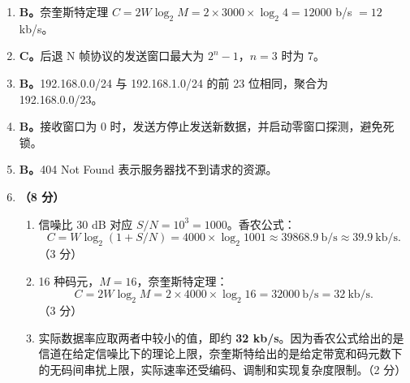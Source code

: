 \documentclass[a4paper,11pt]{article}
\begin{document}

\begin{enumerate}[start=13, label=\textbf{\arabic*.}, leftmargin=2.4em, itemsep=0.45em]

\item \textbf{B。}奈奎斯特定理 $C=2W\log_2M=2\times3000\times\log_2 4=12000$ b/s $=12$ kb/s。

\item \textbf{C。}后退 N 帧协议的发送窗口最大为 $2^{n}-1$，$n=3$ 时为 7。

\item \textbf{B。}192.168.0.0/24 与 192.168.1.0/24 的前 23 位相同，聚合为 192.168.0.0/23。

\item \textbf{B。}接收窗口为 0 时，发送方停止发送新数据，并启动零窗口探测，避免死锁。

\item \textbf{B。}404 Not Found 表示服务器找不到请求的资源。

\item \textbf{（8 分）}
\begin{enumerate}[label=（\arabic*）, leftmargin=2.2em, itemsep=1pt]
  \item 信噪比 $30$ dB 对应 $S/N=10^{3}=1000$。香农公式：
  \[
  C=W\log_2(1+S/N)=4000\times\log_2 1001\approx 39868.9\ \text{b/s}\approx 39.9\ \text{kb/s}.
  \]
  \hfill（3 分）
  \item 16 种码元，$M=16$，奈奎斯特定理：
  \[
  C=2W\log_2M=2\times4000\times\log_2 16=32000\ \text{b/s}=32\ \text{kb/s}.
  \]
  \hfill（3 分）
  \item 实际数据率应取两者中较小的值，即约 \textbf{32 kb/s}。因为香农公式给出的是信道在给定信噪比下的理论上限，奈奎斯特给出的是给定带宽和码元数下的无码间串扰上限，实际速率还受编码、调制和实现复杂度限制。\hfill（2 分）
\end{enumerate}


\end{enumerate}
\end{document}
